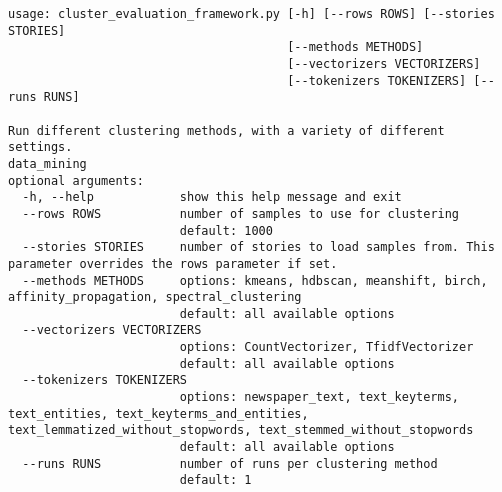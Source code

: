 \begin{lstlisting}[caption=Command line interface for the evaluation framework, label={lst:cluster_evaluation_framework}]
usage: cluster_evaluation_framework.py [-h] [--rows ROWS] [--stories STORIES]
                                       [--methods METHODS]
                                       [--vectorizers VECTORIZERS]
                                       [--tokenizers TOKENIZERS] [--runs RUNS]

Run different clustering methods, with a variety of different settings.
data_mining
optional arguments:
  -h, --help            show this help message and exit
  --rows ROWS           number of samples to use for clustering 
                        default: 1000
  --stories STORIES     number of stories to load samples from. This parameter overrides the rows parameter if set.
  --methods METHODS     options: kmeans, hdbscan, meanshift, birch, affinity_propagation, spectral_clustering 
                        default: all available options
  --vectorizers VECTORIZERS
                        options: CountVectorizer, TfidfVectorizer 
                        default: all available options
  --tokenizers TOKENIZERS
                        options: newspaper_text, text_keyterms, text_entities, text_keyterms_and_entities, text_lemmatized_without_stopwords, text_stemmed_without_stopwords 
                        default: all available options
  --runs RUNS           number of runs per clustering method 
                        default: 1
\end{lstlisting}


